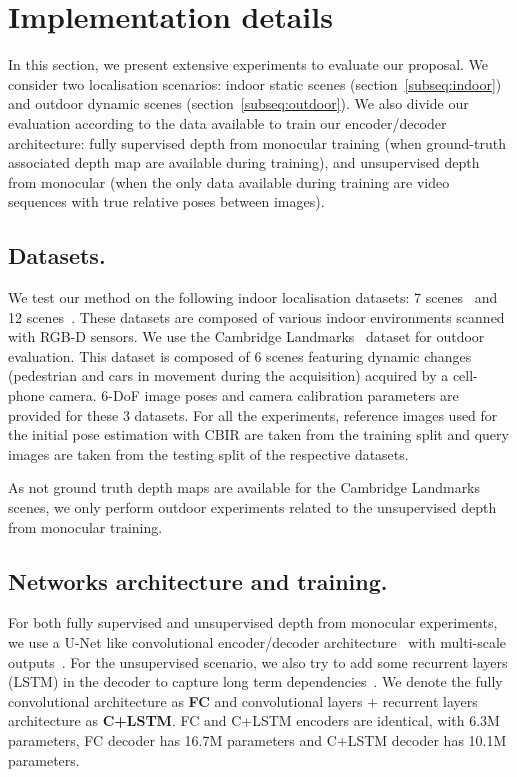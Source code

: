\section{Implementation details}
\label{sec:implementation}
In this section, we present extensive experiments to evaluate our proposal. We consider two localisation scenarios: indoor static scenes (section~\ref{subseq:indoor}) and outdoor dynamic scenes (section~\ref{subseq:outdoor}). We also divide our evaluation according to the data available to train our encoder/decoder architecture: fully supervised depth from monocular training (when ground-truth associated depth map are available during training), and unsupervised depth from monocular (when the only data available during training are video sequences with true relative poses between images).

\subsection{Datasets.} We test our method on the following indoor localisation datasets: 7 scenes~\citep{Shotton2013} and 12 scenes~\citep{Valentin2016}. These datasets are composed of various indoor environments scanned with RGB-D sensors. We use the Cambridge Landmarks~\citep{Kendall2015} dataset for outdoor evaluation. This dataset is composed of 6 scenes featuring dynamic changes (pedestrian and cars in movement during the acquisition) acquired by a cell-phone camera. 6-DoF image poses and camera calibration parameters are provided for these 3 datasets. For all the experiments, reference images used for the initial pose estimation with CBIR are taken from the training split and query images are taken from the testing split of the respective datasets.

As not ground truth depth maps are available for the Cambridge Landmarks scenes, we only perform outdoor experiments related to the unsupervised depth from monocular training.

\subsection{Networks architecture and training.} For both fully supervised and unsupervised depth from monocular experiments, we use a U-Net like convolutional encoder/decoder architecture~\citep{Isola2017} with multi-scale outputs~\citep{Godard2017}. For the unsupervised scenario, we also try to add some recurrent layers (LSTM) in the decoder to capture long term dependencies~\citep{Visin2015, Li2016b}. We denote the fully convolutional architecture as \textbf{FC} and convolutional layers + recurrent layers architecture as \textbf{C+LSTM}. FC and C+LSTM encoders are identical, with 6.3M parameters, FC decoder has 16.7M parameters and C+LSTM decoder has 10.1M parameters.


